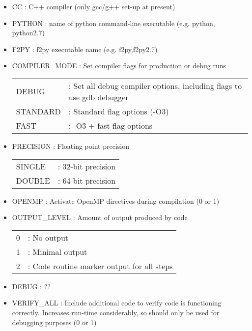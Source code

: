 \documentclass[a4paper]{article}
\begin{document}
\begin{itemize}

\item CC : C++ compiler (only gcc/g++ set-up at present)

\item PYTHON : name of python command-line executable (e.g. python, python2.7)

\item F2PY : f2py executable name (e.g. f2py,f2py2.7)

\item COMPILER\_MODE : Set compiler flags for production or debug runs \\
\begin{tabular}{ll}
DEBUG & : Set all debug compiler options, including flags to use gdb debugger \\
STANDARD & : Standard flag options (-O3) \\
FAST & : -O3 + fast flag options
\end{tabular}

\item PRECISION : Floating point precision \\
\begin{tabular}{ll}
SINGLE & : 32-bit precision \\
DOUBLE & : 64-bit precision
\end{tabular}

\item OPENMP : Activate OpenMP directives during compilation (0 or 1)

\item OUTPUT\_LEVEL : Amount of output produced by code \\
\begin{tabular}{ll}
0 & : No output \\
1 & : Minimal output \\
2 & : Code routine marker output for all steps
\end{tabular}

\item DEBUG : ?? \\

\item VERIFY\_ALL : Include additional code to verify code is functioning correctly.  Increases run-time considerably, so should only be used for debugging purposes (0 or 1)

\end{itemize}
\end{document}
